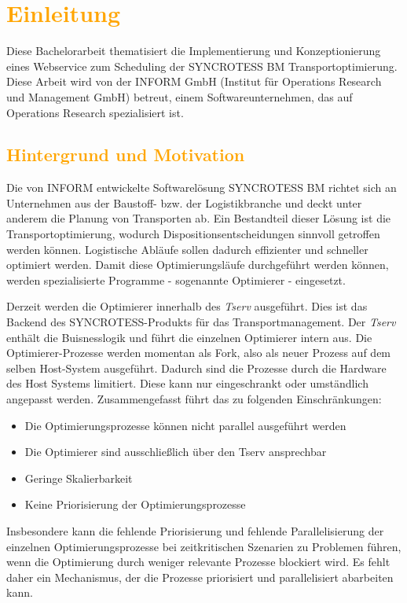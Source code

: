 \chapter{\textcolor{orange}{Einleitung}}

Diese Bachelorarbeit thematisiert die Implementierung und Konzeptionierung eines Webservice zum Scheduling der SYNCROTESS BM Transportoptimierung. Diese Arbeit wird von der INFORM GmbH (Institut für Operations Research und Management GmbH) betreut, einem Softwareunternehmen, das auf Operations Research spezialisiert ist.

\section{\textcolor{orange}{Hintergrund und Motivation}}

Die von INFORM entwickelte Softwarelösung SYNCROTESS BM richtet sich an Unternehmen aus der Baustoff- bzw. der Logistikbranche und deckt unter anderem die Planung von Transporten ab. Ein Bestandteil dieser Lösung ist die Transportoptimierung, wodurch Dispositionsentscheidungen sinnvoll getroffen werden können. Logistische Abläufe sollen dadurch effizienter und schneller optimiert werden. Damit diese Optimierungsläufe durchgeführt werden können, werden spezialisierte Programme - sogenannte Optimierer - eingesetzt.

Derzeit werden die Optimierer innerhalb des \textit{Tserv} ausgeführt. Dies ist das Backend des SYNCROTESS-Produkts für das Transportmanagement. Der \textit{Tserv} enthält die Buisnesslogik und führt die einzelnen Optimierer intern aus. Die Optimierer-Prozesse werden momentan als Fork, also als neuer Prozess auf dem selben Host-System ausgeführt. Dadurch sind die Prozesse durch die Hardware des Host Systems limitiert. Diese kann nur eingeschrankt oder umständlich angepasst werden. Zusammengefasst führt das zu folgenden Einschränkungen:
\begin{itemize}
    \item Die Optimierungsprozesse können nicht parallel ausgeführt werden
    \item Die Optimierer sind ausschließlich über den Tserv ansprechbar
    \item Geringe Skalierbarkeit
    \item Keine Priorisierung der Optimierungsprozesse
\end{itemize}

Insbesondere kann die fehlende Priorisierung und fehlende Parallelisierung der einzelnen Optimierungsprozesse bei zeitkritischen Szenarien zu Problemen führen, wenn die Optimierung durch weniger relevante Prozesse blockiert wird. Es fehlt daher ein Mechanismus, der die Prozesse priorisiert und parallelisiert abarbeiten kann.

